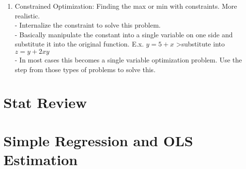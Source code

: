 \documentclass{book}
\begin{document}
\begin{enumerate}
\begin{enumerate}
\begin{enumerate}
            \end{enumerate}
        \end{enumerate}
        \item Constrained Optimization: Finding the max or min with constraints. More realistic.\\
        - Internalize the constraint to solve this problem.\\
        - Basically manipulate the constant into a single variable on one side and substitute it into the original function. E.x. $y = 5 + x$ >substitute into $z = y + 2xy$\\
        - In most cases this becomes a single variable optimization problem. Use the step from those types of problems to solve this.
    \end{enumerate}
\chapter{Stat Review}
\chapter{Simple Regression and OLS Estimation}
\end{document}
